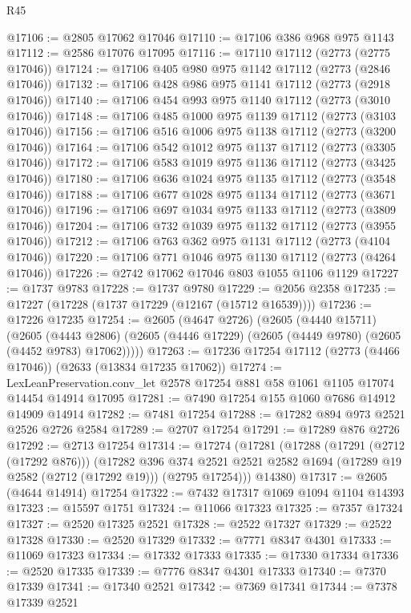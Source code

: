 \begin{lexlean}{R45}
\begin{coremodule}
@17106 := @2805 @17062 @17046
@17110 := @17106 @386 @968 @975 @1143
@17112 := @2586 @17076 @17095
@17116 := @17110 @17112 (@2773 (@2775 @17046))
@17124 := @17106 @405 @980 @975 @1142 @17112 (@2773 (@2846 @17046))
@17132 := @17106 @428 @986 @975 @1141 @17112 (@2773 (@2918 @17046))
@17140 := @17106 @454 @993 @975 @1140 @17112 (@2773 (@3010 @17046))
@17148 := @17106 @485 @1000 @975 @1139 @17112 (@2773 (@3103 @17046))
@17156 := @17106 @516 @1006 @975 @1138 @17112 (@2773 (@3200 @17046))
@17164 := @17106 @542 @1012 @975 @1137 @17112 (@2773 (@3305 @17046))
@17172 := @17106 @583 @1019 @975 @1136 @17112 (@2773 (@3425 @17046))
@17180 := @17106 @636 @1024 @975 @1135 @17112 (@2773 (@3548 @17046))
@17188 := @17106 @677 @1028 @975 @1134 @17112 (@2773 (@3671 @17046))
@17196 := @17106 @697 @1034 @975 @1133 @17112 (@2773 (@3809 @17046))
@17204 := @17106 @732 @1039 @975 @1132 @17112 (@2773 (@3955 @17046))
@17212 := @17106 @763 @362 @975 @1131 @17112 (@2773 (@4104 @17046))
@17220 := @17106 @771 @1046 @975 @1130 @17112 (@2773 (@4264 @17046))
@17226 := @2742 @17062 @17046 @803 @1055 @1106 @1129
@17227 := @1737 @9783
@17228 := @1737 @9780
@17229 := @2056 @2358
@17235 := @17227 (@17228 (@1737 @17229 (@12167 (@15712 @16539))))
@17236 := @17226 @17235
@17254 := @2605
    (@4647 @2726)
    (@2605
      (@4440 @15711)
      (@2605
        (@4443 @2806)
        (@2605 (@4446 @17229) (@2605 (@4449 @9780) (@2605 (@4452 @9783) @17062)))))
@17263 := @17236 @17254 @17112 (@2773 (@4466 @17046)) (@2633 (@13834 @17235 @17062))
@17274 := LexLeanPreservation.conv_let @2578 @17254 @881 @58 @1061 @1105 @17074 @14454 @14914 @17095
@17281 := @7490 @17254 @155 @1060 @7686 @14912 @14909 @14914
@17282 := @7481 @17254
@17288 := @17282 @894 @973 @2521 @2526 @2726 @2584
@17289 := @2707 @17254
@17291 := @17289 @876 @2726
@17292 := @2713 @17254
@17314 := @17274
    (@17281
      (@17288
        (@17291 (@2712 (@17292 @876)))
        (@17282
          @396
          @374
          @2521
          @2521
          @2582
          @1694
          (@17289 @19 @2582 (@2712 (@17292 @19)))
          (@2795 @17254)))
      @14380)
@17317 := @2605 (@4644 @14914) @17254
@17322 := @7432 @17317 @1069 @1094 @1104 @14393
@17323 := @15597 @1751
@17324 := @11066 @17323
@17325 := @7357 @17324
@17327 := @2520 @17325 @2521
@17328 := @2522 @17327
@17329 := @2522 @17328
@17330 := @2520 @17329
@17332 := @7771 @8347 @4301
@17333 := @11069 @17323
@17334 := @17332 @17333
@17335 := @17330 @17334
@17336 := @2520 @17335
@17339 := @7776 @8347 @4301 @17333
@17340 := @7370 @17339
@17341 := @17340 @2521
@17342 := @7369 @17341
@17344 := @7378 @17339 @2521

\end{coremodule}
\end{lexlean}
